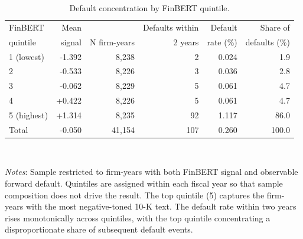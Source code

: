 \begin{table}[htbp]
\centering
\caption{Default concentration by FinBERT quintile.}
\label{tab:t5_quintile}
\small
\begin{tabular}{lrrrrr}
\toprule
FinBERT & Mean & & Defaults within & Default & Share of \\
quintile & signal & N firm-years & 2 years & rate (\%) & defaults (\%) \\
\midrule
1 (lowest) & -1.392 & 8,238 & 2 & 0.024 & 1.9 \\
2 & -0.533 & 8,226 & 3 & 0.036 & 2.8 \\
3 & -0.062 & 8,229 & 5 & 0.061 & 4.7 \\
4 & +0.422 & 8,226 & 5 & 0.061 & 4.7 \\
5 (highest) & +1.314 & 8,235 & 92 & 1.117 & 86.0 \\
\midrule
Total & -0.050 & 41,154 & 107 & 0.260 & 100.0 \\
\bottomrule
\end{tabular}
\\[-1ex]
\begin{flushleft}
\footnotesize
\textit{Notes}: Sample restricted to firm-years with both FinBERT signal and observable forward default. Quintiles are assigned within each fiscal year so that sample composition does not drive the result. The top quintile (5) captures the firm-years with the most negative-toned 10-K text. The default rate within two years rises monotonically across quintiles, with the top quintile concentrating a disproportionate share of subsequent default events.
\end{flushleft}
\end{table}